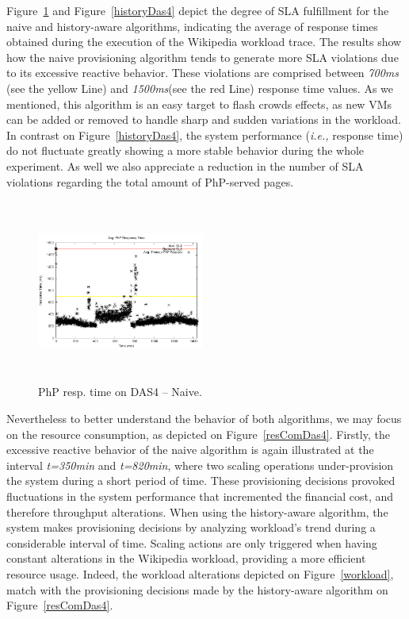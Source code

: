 Figure~\ref{naiveDas4} and Figure~\ref{historyDas4} depict the degree of SLA fulfillment for the naive and history-aware algorithms, indicating the average of response times obtained during the execution of the Wikipedia workload trace. The results show how the naive provisioning algorithm tends to generate more SLA violations due to its excessive reactive behavior. These violations are comprised between \emph{700ms} (see the yellow Line) and \emph{1500ms}(see the red Line) response time values. As we mentioned, this algorithm is an easy target to flash crowds effects, as new VMs can be added or removed  to handle sharp and sudden variations in the workload. In contrast on Figure~\ref{historyDas4}, the system performance (\emph{i.e.,} response time) do not fluctuate greatly showing a more stable behavior during the whole experiment. As well we also appreciate a reduction in the number of SLA violations regarding the total amount of PhP-served pages.


\begin{figure}

\begin{center}
\includegraphics[width=0.49\textwidth, height=6cm]{./images/homogeneous/avgTimeout_PhP_naive}
\end{center}
\caption{PhP resp. time on DAS4 -- Naive.}
\label{naiveDas4}
\end{figure}

Nevertheless to better understand the behavior of both algorithms, we may focus on the resource consumption, as depicted on Figure~\ref{resComDas4}. Firstly, the excessive reactive behavior of the naive algorithm is again illustrated at the interval \emph{t=350min} and \emph{t=820min}, where two scaling operations under-provision the system during a short period of time. These provisioning decisions provoked fluctuations in the system performance that incremented the financial cost, and therefore throughput alterations. When using the history-aware algorithm, the system makes provisioning decisions by analyzing workload's trend during a considerable interval of time. Scaling actions are only triggered when having constant alterations in the Wikipedia workload, providing a more efficient resource usage. Indeed, the workload alterations depicted on Figure~\ref{workload}, match with the provisioning decisions made by the history-aware algorithm on Figure~\ref{resComDas4}.

